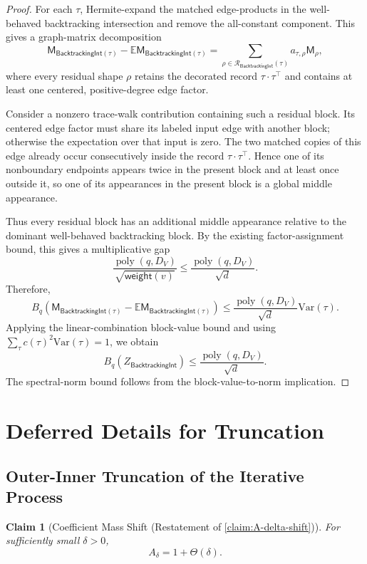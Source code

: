 \documentclass[12pt]{article}
\def \E {\mathbb{E}}
\newcommand{\wt}[1]{\widetilde{#1}}
\newcommand{\Var}{\mathrm{Var}}
\newtheorem{claim}[theorem]{Claim}
\newcommand{\poly}{\operatorname{poly}}
\renewcommand{\wt}{\mathsf{weight}}
\newcommand{\calR}{\mathcal{R}}
\newcommand{\cm}{\mathsf{M} }
\newcommand{\bti}{\mathsf{BacktrackingInt}}
\begin{document}
\begin{proof}
For each \(\tau\), Hermite-expand the matched edge-products in the
well-behaved backtracking intersection and remove the all-constant
component. This gives a graph-matrix decomposition
\[
    \cm_{\bti(\tau)}
    -
    \E\cm_{\bti(\tau)}
    =
    \sum_{\rho\in\calR_{\bti}(\tau)}
    a_{\tau,\rho}\cm_\rho,
\]
where every residual shape \(\rho\) retains the decorated record
\(\tau\cdot\tau^\top\) and contains at least one centered,
positive-degree edge factor.

Consider a nonzero trace-walk contribution containing such a residual
block. Its centered edge factor must share its labeled input edge with
another block; otherwise the expectation over that input is zero.
The two matched copies of this edge already occur consecutively inside
the record \(\tau\cdot\tau^\top\). Hence one of its nonboundary
endpoints appears twice in the present block and at least once outside
it, so one of its appearances in the present block is a global middle
appearance.

Thus every residual block has an additional middle appearance relative
to the dominant well-behaved backtracking block. By the existing
factor-assignment bound, this gives a multiplicative gap
\[
    \frac{\poly(q,D_V)}
         {\sqrt{\wt(v)}}
    \leq
    \frac{\poly(q,D_V)}{\sqrt d}.
\]
Therefore,
\[
    B_q\!\left(
        \cm_{\bti(\tau)}
        -
        \E\cm_{\bti(\tau)}
    \right)
    \leq
    \frac{\poly(q,D_V)}{\sqrt d}\Var(\tau).
\]
Applying the linear-combination block-value bound and using
\(\sum_\tau c(\tau)^2\Var(\tau)=1\), we obtain
\[
    B_q(Z_{\bti})
    \leq
    \frac{\poly(q,D_V)}{\sqrt d}.
\]
The spectral-norm bound follows from the block-value-to-norm
implication.
\end{proof}
\section{Deferred Details for Truncation}
\label{sec:defer-details-truncation}

\subsection{Outer-Inner Truncation of the Iterative Process}
\begin{claim}[Coefficient Mass Shift (Restatement of \cref{claim:A-delta-shift})]
For sufficiently small \(\delta>0\),
\[
    A_\delta=1+\Theta(\delta).
\]
\end{claim}
\end{document}

